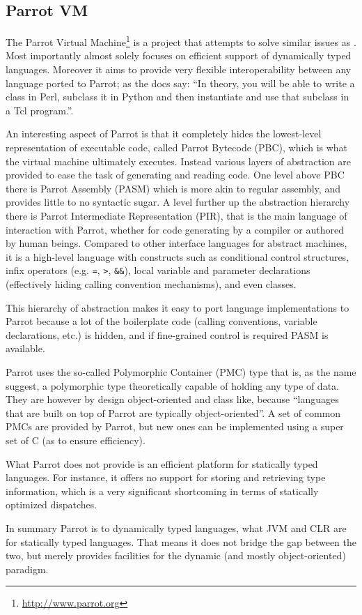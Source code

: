 


\subsection{Parrot VM}

The Parrot Virtual Machine\footnote{\url{http://www.parrot.org}} is a project
that attempts to solve similar issues as \thename{}. Most importantly almost solely
focuses on efficient support of dynamically typed languages. Moreover it aims to
provide very flexible interoperability between any language ported to Parrot; as
the docs say: ``In theory, you will be able to write a class in Perl, subclass
it in Python and then instantiate and use that subclass in a Tcl
program.''\cite{parrot-docs}.

An interesting aspect of Parrot is that it completely hides the lowest-level
representation of executable code, called Parrot Bytecode (PBC), which is what
the virtual machine ultimately executes. Instead various layers of abstraction
are provided to ease the task of generating and reading code. One level above
PBC there is Parrot Assembly (PASM) which is more akin to regular assembly, and
provides little to no syntactic sugar. A level further up the abstraction
hierarchy there is Parrot Intermediate Representation (PIR), that is the main
language of interaction with Parrot, whether for code generating by a compiler
or authored by human beings. Compared to other interface languages for abstract
machines, it is a high-level language with constructs such as conditional
control structures, infix operators (e.g. \texttt{=}, \texttt{>},
\texttt{\&\&}), local variable and parameter declarations (effectively hiding
calling convention mechanisms), and even classes.

This hierarchy of abstraction makes it easy to port language implementations to
Parrot because a lot of the boilerplate code (calling conventions, variable
declarations, etc.) is hidden, and if fine-grained control is required PASM is
available.

Parrot uses the so-called Polymorphic Container (PMC) type that is, as the name
suggest, a polymorphic type theoretically capable of holding any type of
data. They are however by design object-oriented and class like, because
``languages that are built on top of Parrot are typically
object-oriented''\cite{parrot-docs}. A set of common PMCs are provided by
Parrot, but new ones can be implemented using a super set of C (as to ensure
efficiency).

What Parrot does not provide is an efficient platform for statically typed
languages. For instance, it offers no support for storing and retrieving type
information, which is a very significant shortcoming in terms of statically
optimized dispatches.

In summary Parrot is to dynamically typed languages, what JVM and CLR are for
statically typed languages. That means it does not bridge the gap between the
two, but merely provides facilities for the dynamic (and mostly object-oriented)
paradigm.
